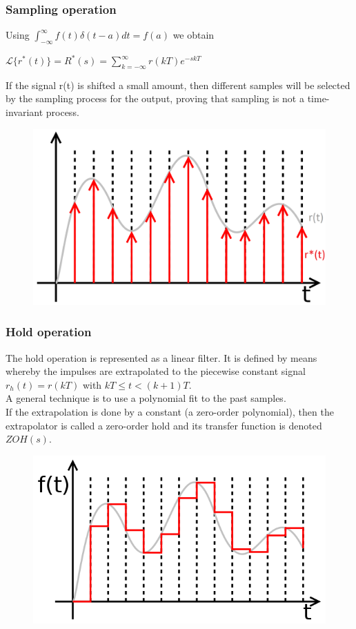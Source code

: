\begin{frame}
	\frametitle{Sampling operation}
	Using $\int_{-\infty}^{\infty} f(t)\delta(t-a)dt = f(a)$ we obtain \\ 
	\begin{center}
		$\mathcal{L}\{r^*(t)\} = R^*(s) = \sum_{k=-\infty}^{\infty} r(kT)e^{-skT}$
	\end{center}
	If the signal r(t) is shifted a small amount, then different samples will be selected by the sampling process for the output, proving that sampling is not a time-invariant process.
	\begin{figure}
		\includegraphics[width=0.57\linewidth]{sampled_signal}
	\end{figure}
\end{frame}

\begin{frame}
	\frametitle{Hold operation}
	The hold operation is represented as a linear filter. It is defined by means whereby the impulses are extrapolated to the piecewise constant signal $r_h(t) = r(kT)$ with $kT \leq t < (k+1)T$.\\
	\medskip
	A general technique is to use a polynomial fit to the past samples.\\
	If the extrapolation is done by a constant (a zero-order polynomial), then the extrapolator is called a zero-order hold and its transfer function is denoted $ZOH(s)$. 
	\begin{figure}
		\includegraphics[width=0.52\linewidth]{sample_and_hold}
	\end{figure}
\end{frame}

